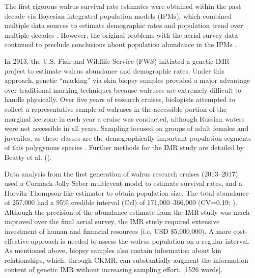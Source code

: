 The first rigorous walrus survival rate estimates were obtained within
the past decade via Bayesian integrated population models (IPMs),
which combined multiple data sources to estimate demographic rates
and population trend over multiple decades \citep{taylor_demography_2015,taylor_demography_2018}.
However, the original problems with the aerial survey data continued
to preclude conclusions about population abundance in the IPMs \citep{taylor_demography_2015}.

In 2013, the U.S. Fish and Wildlife Service (FWS) initiated a genetic
IMR project to estimate walrus abundance and demographic rates. Under
this approach, genetic ``marking'' via skin biopsy samples \citep{palsboll_genetic_1997}
provided a major advantage over traditional marking techniques because
walruses are extremely difficult to handle physically. Over five years
of research cruises, biologists attempted to collect a representative
sample of walruses in the accessible portion of the marginal ice zone
in each year a cruise was conducted, although Russian waters were
not accessible in all years. Sampling focused on groups of adult females
and juveniles, as these classes are the demographically important
population segments of this polygynous species \citep{fay_ecology_1982}.
Further methods for the IMR study are detailed by Beatty et al. (\cite*{beatty_panmixia_2020,beatty_estimating_2022}).

Data analysis from the first generation of walrus research cruises
(2013–2017) used a Cormack-Jolly-Seber multievent model to estimate
survival rates, and a Horvitz-Thompson-like estimator to obtain population
size. The total abundance of 257,000 had a 95\% credible interval
(CrI) of 171,000–366,000 (CV=0.19; \citealt{beatty_estimating_2022}).
Although the precision of the abundance estimate from the IMR study
was much improved over the final aerial survey, the IMR study required
extensive investment of human and financial resources (i.e, USD \$5,000,000).
A more cost-effective approach is needed to assess the walrus population
on a regular interval. As mentioned above, biopsy samples also contain
information about kin relationships, which, through CKMR, can substantially
augment the information content of genetic IMR without increasing
sampling effort. {[}1526 words{]}.%

